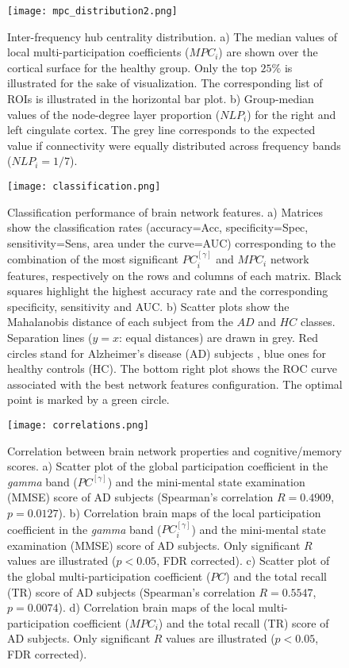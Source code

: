 \newpage
\begin{figure}[!ht]
	\centering
	\texttt{[image: mpc\_distribution2.png]}
	\caption{Inter-frequency hub centrality distribution. a) The median values of local multi-participation coefficients ($MPC_i$) are shown over the cortical surface for the healthy group. Only the top $25\%$ is illustrated for the sake of visualization. The corresponding list of ROIs is illustrated in the horizontal bar plot. b) Group-median values of the node-degree layer proportion ($NLP_i$) for the right and left cingulate cortex. The grey line corresponds to the expected value if connectivity were equally distributed across frequency bands ($NLP_i=1/7$).}
	\label{fig:mpc}
\end{figure}

\newpage
\begin{figure}[!ht]
	\centering
	\texttt{[image: classification.png]}
	\caption{Classification performance of brain network features.
	a) Matrices show the classification rates (accuracy=Acc, specificity=Spec, sensitivity=Sens, area under the curve=AUC) corresponding to the combination of the most significant $PC^{[\gamma]}_i$ and $MPC_i$ network features, respectively on the rows and columns of each matrix. Black squares highlight the highest accuracy rate and the corresponding specificity, sensitivity and AUC.
	b) Scatter plots show the Mahalanobis distance of each subject from the $AD$ and $HC$ classes.  Separation lines ($y=x$: equal distances) are drawn in grey. Red circles stand for Alzheimer's disease (AD) subjects , blue ones for healthy controls (HC).
The bottom right plot shows the ROC curve associated with the best network features configuration. The optimal point is marked by a green circle.}
	\label{fig:classification}
\end{figure}

\newpage
\begin{figure}[!ht]
	\centering
	\texttt{[image: correlations.png]}
	\caption{Correlation between brain network properties and cognitive/memory scores.
	a) Scatter plot of the global participation coefficient in the \textit{gamma} band ($PC^{[\gamma]}$) and the mini-mental state examination (MMSE) score of AD subjects (Spearman's correlation $R = 0.4909$, $p = 0.0127$).
	b) Correlation brain maps of the local participation coefficient in the \textit{gamma} band ($PC_i^{[\gamma]}$) and the mini-mental state examination (MMSE) score of AD subjects. Only significant $R$ values are illustrated ($p<0.05$, FDR corrected).
	c) Scatter plot of the global multi-participation coefficient ($PC$) and the total recall (TR) score of AD subjects (Spearman's correlation  $R = 0.5547$, $p = 0.0074$).
	d) Correlation brain maps of the local multi-participation coefficient ($MPC_i$) and the total recall (TR) score of AD subjects. Only significant $R$ values are illustrated ($p<0.05$, FDR corrected).
}
	\label{fig:correlations}
\end{figure}

